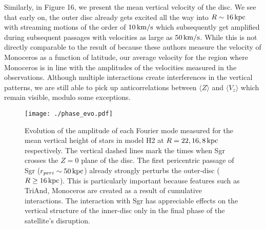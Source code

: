 \documentclass[useAMS,usenatbib]{mnras}
\begin{document}
Similarly, in Figure 16, we present the mean vertical velocity of the disc. We see that early on, the  outer disc already gets excited all the way into $R\sim 16 \,\rm{kpc}$ with streaming motions of the order of $10\,\rm{km/s}$ which subsequently get amplified during subsequent passages with velocities as large as $50\,\rm{km/s}$. While this is not directly comparable to the result of \cite{deboer17} because these authors measure the velocity of Monoceros as a function of latitude, our average velocity for the region where Monoceros is in line with the amplitudes of the velocities measured in the observations. Although multiple interactions create interferences in the vertical patterns, we are still able to pick up anticorrelations between $\langle Z \rangle$ and $\langle V_{z} \rangle$ which remain visible, modulo some exceptions.

\begin{figure}
\texttt{[image: ./phase\_evo.pdf]}
\caption[]{Evolution of the amplitude of each Fourier mode measured for the mean vertical height of stars in model H2 at $R=22,16,8 \,\rm{kpc}$ respectively. The vertical dashed lines mark the times when Sgr crosses the $Z=0$ plane of the disc. The first pericentric passage of Sgr ($r_{peri}\sim 50 \,\rm{kpc}$) already strongly perturbs the outer-disc ($R\geq 16\,\rm{kpc}$). This is particularly important because features such as TriAnd, Monoceros are created as a result of cumulative interactions. The interaction with Sgr has appreciable effects on the vertical structure of the inner-disc only in the final phase of the satellite's disruption.}
\end{figure}
\end{document}
